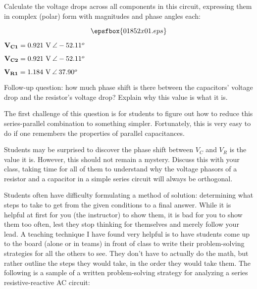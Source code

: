 

Calculate the voltage drops across all components in this circuit, expressing them in complex (polar) form with magnitudes and phase angles each:

$$\epsfbox{01852x01.eps}$$







${\bf V_{C1}} = 0.921 \hbox { V} \> \angle -52.11^o$

${\bf V_{C2}} = 0.921 \hbox { V} \> \angle -52.11^o$

${\bf V_{R1}} = 1.184 \hbox { V} \> \angle \> 37.90^o$

\vskip 10pt

Follow-up question: how much phase shift is there between the capacitors' voltage drop and the resistor's voltage drop?  Explain why this value is what it is.







The first challenge of this question is for students to figure out how to reduce this series-parallel combination to something simpler.  Fortunately, this is very easy to do if one remembers the properties of parallel capacitances.

Students may be surprised to discover the phase shift between $V_C$ and $V_R$ is the value it is.  However, this should not remain a mystery.  Discuss this with your class, taking time for all of them to understand why the voltage phasors of a resistor and a capacitor in a simple series circuit will always be orthogonal.

\vskip 10pt

Students often have difficulty formulating a method of solution: determining what steps to take to get from the given conditions to a final answer.  While it is helpful at first for you (the instructor) to show them, it is bad for you to show them too often, lest they stop thinking for themselves and merely follow your lead.  A teaching technique I have found very helpful is to have students come up to the board (alone or in teams) in front of class to write their problem-solving strategies for all the others to see.  They don't have to actually do the math, but rather outline the steps they would take, in the order they would take them.  The following is a sample of a written problem-solving strategy for analyzing a series resistive-reactive AC circuit:

